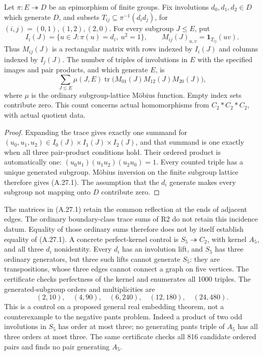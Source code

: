 Let \(\pi:E\twoheadrightarrow D\) be an epimorphism of
finite groups. Fix involutions \(d_0,d_1,d_2\in D\)
which generate \(D\), and subsets
\(T_{ij}\subseteq\pi^{-1}(d_id_j)\), for
\((i,j)=(0,1),(1,2),(2,0)\). For every subgroup
\(J\leq E\), put
\[
 I_i(J)=\{u\in J:\pi(u)=d_i,\ u^2=1\},
 \qquad
 M_{ij}(J)_{u,v}=\mathbf1_{T_{ij}}(uv).
\]
Thus \(M_{ij}(J)\) is a rectangular matrix with rows
indexed by \(I_i(J)\) and columns indexed by
\(I_j(J)\). The number of triples of involutions
in \(E\) with the specified images and pair products,
and which generate \(E\), is
\[
 \sum_{J\leq E}\mu(J,E)
       \operatorname{tr}\bigl(M_{01}(J)M_{12}(J)M_{20}(J)\bigr),
 \tag{A.27.1}
\]
where \(\mu\) is the ordinary subgroup-lattice
M\"obius function. Empty index sets contribute zero.
This count concerns actual homomorphisms from
\(C_2*C_2*C_2\), with actual quotient data.

\begin{proof}
Expanding the trace gives exactly one summand for
\((u_0,u_1,u_2)\in I_0(J)\times I_1(J)\times I_2(J)\),
and that summand is one exactly when all three
pair-product conditions hold. Their ordered product
is automatically one:
\((u_0u_1)(u_1u_2)(u_2u_0)=1\).
Every counted triple has a unique generated subgroup.
M\"obius inversion on the finite subgroup lattice
therefore gives (A.27.1). The assumption that the
\(d_i\) generate makes every subgroup not mapping
onto \(D\) contribute zero.
\end{proof}

The matrices in (A.27.1) retain the common reflection
at the ends of adjacent edges. The ordinary
boundary-class trace sums of R2 do not retain this
incidence datum. Equality of those ordinary sums
therefore does not by itself establish equality of
(A.27.1). A concrete perfect-kernel control is
\(S_5\twoheadrightarrow C_2\), with kernel \(A_5\),
and all three \(d_i\) nonidentity. Every \(d_i\)
has an involution lift, and \(S_5\) has three
ordinary generators, but three such lifts cannot
generate \(S_5\): they are transpositions, whose
three edges cannot connect a graph on five vertices.
The certificate 
checks perfectness of the kernel and enumerates
all 1000 triples. The generated-subgroup orders
and multiplicities are
\[
 (2,10),\quad(4,90),\quad(6,240),\quad
 (12,180),\quad(24,480).
\]
This is a control on a proposed general real
embedding theorem, not a counterexample to the
negative pants problem. Indeed a product of two
odd involutions in \(S_5\) has order at most three;
no generating pants triple of \(A_5\) has all
three orders at most three. The same certificate
checks all 816 candidate ordered pairs and finds
no pair generating \(A_5\).

